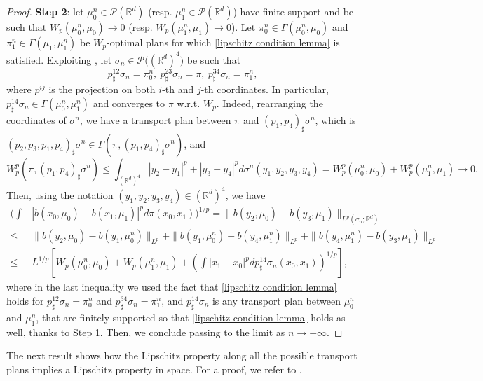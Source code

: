 \documentclass[10pt,leqno]{amsart}
\numberwithin{equation}{section}
\newcommand{\R}{\mathbb{R}}
\newcommand{\PP}{\mathcal{P}}
\begin{document}
\begin{proof}
        \textbf{Step 2}: let $\mu_0^n \in \PP(\R^d)$ (resp. $\mu_1^n\in \PP(\R^d)$) have finite support and be such that $W_p(\mu_0^n,\mu_0) \to 0$ (resp. $W_p(\mu_1^n,\mu_1) \to 0$). Let $\pi_0^n \in \Gamma(\mu_0^n,\mu_0)$ and $\pi_1^n \in \Gamma(\mu_1,\mu_1^n)$ be $W_p$-optimal plans for which \eqref{lipschitz condition lemma} is satisfied. Exploiting \cite[Proposition 8.6]{ambrosio2021lectures}, let $\sigma_n \in \PP\big((\R^d)^4\big)$ be such that
        \[p^{12}_\sharp \sigma_n = \pi_0^n, \ p^{23}_\sharp \sigma_n = \pi, \ p^{34}_\sharp \sigma_n = \pi^n_1,\]
        where $p^{ij}$ is the projection on both $i$-th and $j$-th coordinates. In particular, $p^{14}_\sharp \sigma_n \in \Gamma(\mu_0^n,\mu_1^n)$ and converges to $\pi$ w.r.t. $W_p$. Indeed, rearranging the coordinates of $\sigma^n$, we have a transport plan between $\pi$ and $(p_1,p_4)_\sharp \sigma^n$, which is $(p_2,p_3,p_1,p_4)_\sharp \sigma^n \in \Gamma(\pi,(p_1,p_4)_\sharp \sigma^n)$, and \[W_p^p(\pi,(p_1,p_4)_\sharp \sigma^n)\leq \int_{(\R^{d})^4}|y_2-y_1|^p + |y_3-y_4|^p d\sigma^n(y_1,y_2,y_3,y_4) = W_p^p(\mu_0^n,\mu_0) + W_p^p(\mu_1^n,\mu_1) \to 0.\]  
        Then, using the notation $(y_1,y_2,y_3,y_4)\in (\R^d)^4$, we have 
        \begin{align*}
            \bigg(\int & |b(x_0,\mu_0) - b(x_1,\mu_1)|^p d\pi(x_0,x_1)\bigg)^{1/p} = \| b(y_2,\mu_0) - b(y_3,\mu_1) \|_{L^p(\sigma_n;\R^d)} 
            \\
            \leq & 
            \| b(y_2,\mu_0) - b(y_1,\mu_0^n) \|_{L^p} + \| b(y_1,\mu_0^n) - b(y_4,\mu_1^n) \|_{L^p} + \| b(y_4,\mu_1^n) - b(y_3,\mu_1) \|_{L^p} 
            \\
            \leq &
            L^{1/p} \left[ W_p(\mu_0^n,\mu_0) + W_p(\mu_1^n,\mu_1) + \left(\int |x_1-x_0|^p dp^{14}_\sharp \sigma_n(x_0,x_1)\right)^{1/p} \right],
        \end{align*}
        where in the last inequality we used the fact that \eqref{lipschitz condition lemma} holds for $p^{12}_\sharp \sigma_n = \pi_0^n$ and $p^{34}_\sharp \sigma_n = \pi^n_1$, and $p^{14}_\sharp \sigma_n$ is any transport plan between $\mu_0^n$ and $\mu_1^n$, that are finitely supported so that \eqref{lipschitz condition lemma} holds as well, thanks to Step 1. Then, we conclude passing to the limit as $n\to +\infty$.
    \end{proof}

    The next result shows how the Lipschitz property along all the possible transport plans implies a Lipschitz property in space. For a proof, we refer to \cite[Theorem 4.8, (1)]{cavagnari2020extension}.
\end{document}
